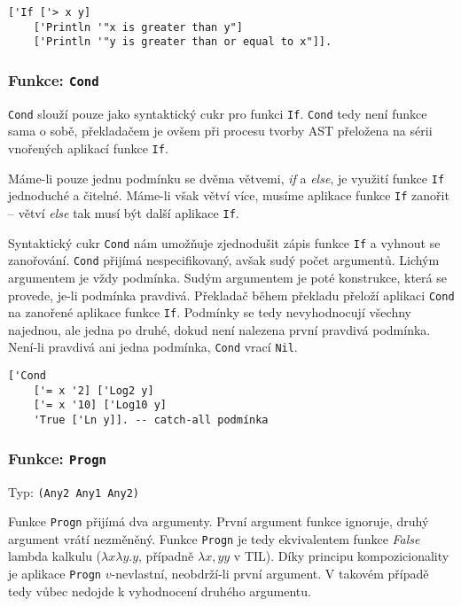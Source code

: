 \begin{lstlisting}[caption={Ukázka využití If}]
['If ['> x y]
    ['Println '"x is greater than y"]
    ['Println '"y is greater than or equal to x"]].
\end{lstlisting}

\subsubsection*{Funkce: \lstinline{Cond}}\label{cond-documentation}

\lstinline{Cond} slouží pouze jako syntaktický cukr pro funkci \lstinline{If}. \lstinline{Cond} tedy
není funkce sama o sobě, překladačem je ovšem při procesu tvorby AST přeložena na sérii vnořených
aplikací funkce \lstinline{If}.

Máme-li pouze jednu podmínku se dvěma větvemi, \textit{if} a \textit{else}, je využití funkce
\lstinline{If} jednoduché a čitelné. Máme-li však větví více, musíme aplikace funkce \lstinline{If}
zanořit -- větví \textit{else} tak musí být další aplikace \lstinline{If}.

Syntaktický cukr \lstinline{Cond} nám umožňuje zjednodušit zápis funkce \lstinline{If} a vyhnout
se zanořování. \lstinline{Cond} přijímá nespecifikovaný, avšak sudý počet argumentů. Lichým
argumentem je vždy podmínka. Sudým argumentem je poté konstrukce, která se provede, je-li podmínka
pravdivá. Překladač během překladu přeloží aplikaci \lstinline{Cond} na zanořené aplikace funkce
\lstinline{If}. Podmínky se tedy nevyhodnocují všechny najednou, ale jedna po druhé, dokud není
nalezena první pravdivá podmínka. Není-li pravdivá ani jedna podmínka, \lstinline{Cond} vrací
\lstinline{Nil}.

\begin{lstlisting}[caption={Ukázka využití Cond}]
['Cond
    ['= x '2] ['Log2 y]
    ['= x '10] ['Log10 y]
    'True ['Ln y]]. -- catch-all podmínka
\end{lstlisting}

\subsubsection*{Funkce: \lstinline{Progn}}\label{progn-fn}
Typ: \lstinline{(Any2 Any1 Any2)}

Funkce \lstinline{Progn} přijímá dva argumenty. První argument funkce ignoruje, druhý argument vrátí
nezměněný. Funkce \lstinline{Progn} je tedy ekvivalentem funkce \textit{False} lambda kalkulu
($\lambda x \lambda y . y$, případně $\lambda x, y y$ v TIL)\cite{lambda-calculus}. Díky principu kompozicionality je
aplikace \lstinline{Progn} $v$-nevlastní, neobdrží-li první argument. V takovém případě tedy vůbec
nedojde k vyhodnocení druhého argumentu.

